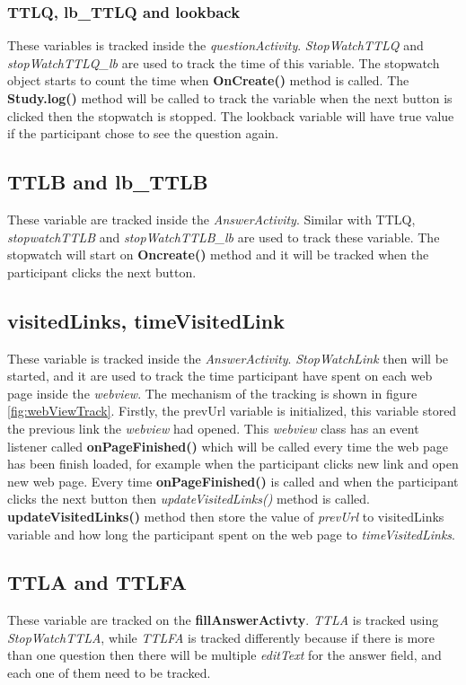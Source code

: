 \subsubsection{TTLQ, lb\_TTLQ and lookback}
These variables is tracked inside the \textit{questionActivity}.
\textit{StopWatchTTLQ} and \textit{stopWatchTTLQ\_lb} are used to track the time of this variable.
The stopwatch object starts to count the time when \textbf{OnCreate()} method is called.
The \textbf{Study.log()} method will be called to track the variable when the next button is clicked then the stopwatch is stopped.
The lookback variable will have true value if the participant chose to see the question again.

\subsection{TTLB and lb\_TTLB}
These variable are tracked inside the \textit{AnswerActivity}. Similar with TTLQ,
\textit{stopwatchTTLB} and \textit{stopWatchTTLB\_lb} are used to track these variable.
The stopwatch will start on \textbf{Oncreate()} method and it will be tracked when the participant clicks the next button.

\subsection{visitedLinks, timeVisitedLink}
These variable is tracked inside the \textit{AnswerActivity}.
\textit{StopWatchLink} then will be started, and it are used to track the time participant have spent on each web page inside the \textit{webview}.
The mechanism of the tracking is shown in figure \ref{fig:webViewTrack}. Firstly, the prevUrl variable is initialized,
this variable stored the previous link the \textit{webview} had opened. This \textit{webview} class has an event listener called \textbf{onPageFinished()}
 which will be called every time the web page has been finish loaded, for example when the participant clicks new  link and open new web page.
  Every time \textbf{onPageFinished()} is called and when the participant clicks the next button then \textit{updateVisitedLinks()} method is called.
  \textbf{updateVisitedLinks()} method then store the value of \textit{prevUrl}
 to visitedLinks variable and how long the participant spent on the web page to \textit{timeVisitedLinks}.

\subsection{TTLA and TTLFA}
These variable are tracked on the \textbf{fillAnswerActivty}. \textit{TTLA} is tracked using \textit{StopWatchTTLA}, while
\textit{TTLFA} is tracked differently because if there is more than one question then there will be multiple \textit{editText} for the answer field, and
each one of them need to be tracked.

